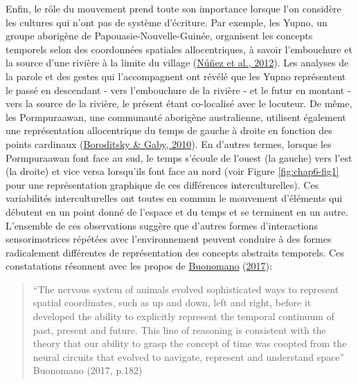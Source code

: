 \documentclass[
  a4paper,12pt,twoside,onecolumn,openright,final,oldfontcommands]{memoir}
\begin{document}
Enfin, le rôle du mouvement prend toute son importance lorsque l'on considère les cultures qui n'ont pas de système d'écriture. Par exemple, les Yupno, un groupe aborigène de Papouasie-Nouvelle-Guinée, organisent les concepts temporels selon des coordonnées spatiales allocentriques, à savoir l'embouchure et la source d'une rivière à la limite du village (\protect\hyperlink{ref-nunez_contours_2012}{Núñez et al., 2012}). Les analyses de la parole et des gestes qui l'accompagnent ont révélé que les Yupno représentent le passé en descendant - vers l'embouchure de la rivière - et le futur en montant - vers la source de la rivière, le présent étant co-localisé avec le locuteur. De même, les Pormpuraawan, une communauté aborigène australienne, utilisent également une représentation allocentrique du temps de gauche à droite en fonction des points cardinaux (\protect\hyperlink{ref-boroditsky_remembrances_2010}{Boroditsky \& Gaby, 2010}). En d'autres termes, lorsque les Pormpuraawan font face au sud, le temps s'écoule de l'ouest (la gauche) vers l'est (la droite) et vice versa lorsqu'ils font face au nord (voir Figure \ref{fig:chap6-fig1} pour une représentation graphique de ces différences interculturelles). Ces variabilités interculturelles ont toutes en commun le mouvement d'éléments qui débutent en un point donné de l'espace et du temps et se terminent en un autre.\\
L'ensemble de ces observations suggère que d'autres formes d'interactions sensorimotrices répétées avec l'environnement peuvent conduire à des formes radicalement différentes de représentation des concepts abstraits temporels. Ces constatations résonnent avec les propos de \protect\hyperlink{ref-buonomano_your_2017}{Buonomano} (\protect\hyperlink{ref-buonomano_your_2017}{2017}):

\begin{quote}
``The nervous system of animals evolved sophisticated ways to represent spatial coordinates, such as up and down, left and right, before it developed the ability to explicitly represent the temporal continuum of past, present and future. This line of reasoning is consistent with the theory that our ability to grasp the concept of time was coopted from the neural circuits that evolved to navigate, represent and understand space'' Buonomano (2017, p.182)
\end{quote}
\end{document}
